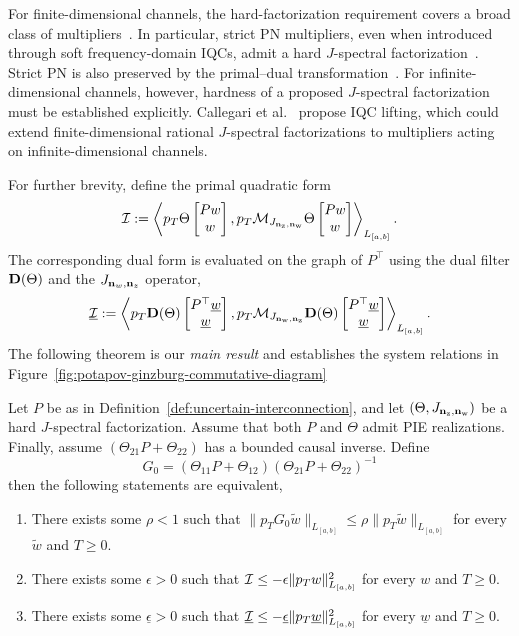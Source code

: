 \begin{remark}
For finite-dimensional channels, the hard-factorization requirement covers a
broad class of multipliers~\cite{9781263,6915700,scherer2018dynamicdissipation}. In particular, strict PN
multipliers, even when introduced through soft frequency-domain IQCs, admit a
hard $J$-spectral factorization~\cite[Thm.~4]{6915700}. Strict PN is also
preserved by the primal--dual transformation~\cite{venkataraman}.
For infinite-dimensional channels,
however, hardness of a proposed $J$-spectral factorization must be established
explicitly. Callegari et al.~\cite{callegari} propose IQC lifting, which could
extend finite-dimensional rational $J$-spectral factorizations to multipliers
acting on infinite-dimensional channels.
\end{remark}
For further brevity, define the primal quadratic form
\[\mathcal{I} := \left\langle p_T \Theta\begin{bmatrix}Pw \\ w\end{bmatrix}, p_T \mathcal{M}_{J_{\mathbf{n}_{{\mathrm{z}}}, \mathbf{n}_{{\mathrm{w}}}}}\Theta\begin{bmatrix}Pw \\ w\end{bmatrix} \right\rangle_{L_{[a,b]}} .\]
The corresponding dual form is evaluated on the graph of $P^\top$ using the
dual filter $\mathbf{D}(\Theta)$ and the $J_{\mathbf{n}_w, \mathbf{n}_z}$ operator,
\[\underline{\mathcal{I}} := \left\langle p_T \mathbf{D}(\Theta)\begin{bmatrix}P^\top\underline{w} \\ \underline{w}\end{bmatrix}, p_T \mathcal{M}_{J_{\mathbf{n}_{{\mathrm{w}}}, \mathbf{n}_{{\mathrm{z}}}}}\mathbf{D}(\Theta)\begin{bmatrix}P^\top\underline{w} \\ \underline{w}\end{bmatrix} \right\rangle_{L_{[a,b]}} .\]
The following theorem is our \emph{main result} and establishes the system relations in Figure~\ref{fig:potapov-ginzburg-commutative-diagram} 
\begin{theorem}\label{thm:dual-iqc}
Let $P$ be as in Definition~\ref{def:uncertain-interconnection}, and let
$(\Theta,J_{\mathbf{n}_{{\mathrm{z}}},\mathbf{n}_{{\mathrm{w}}}})$ be a hard
$J$-spectral factorization. Assume that both $P$ and $\Theta$ admit
PIE realizations.    Finally, assume $(\Theta_{21}P +\Theta_{22})$ has a bounded causal inverse. 
    Define 
    \begin{equation*}
        G_0 = (\Theta_{11}P +\Theta_{12})(\Theta_{21}P+\Theta_{22})^{-1}
    \end{equation*} 
    then the following statements are equivalent,
    \begin{enumerate}
        \item There exists some $\rho<1$ such that $\|p_T G_0 \tilde{w}\|_{L_{[a,b]}}\leq\rho\|p_T \tilde{w}\|_{L_{[a,b]}}$ for every $\tilde{w}$ and $T\geq 0 $.
        \item There exists some $\epsilon > 0$ such that $\mathcal{I}\leq - \epsilon \|p_T w\|_{L_{[a,b]}}^2$ for every $w$ and $T\geq0$.
        \item There exists some $\underline{\epsilon}>0$ such that $\underline{\mathcal{I}} \leq - \underline{\epsilon}\|p_T\underline{w}\|_{L_{[a,b]}}^2$ for every $\underline w$ and $T\geq0$.
    \end{enumerate}
\end{theorem}
